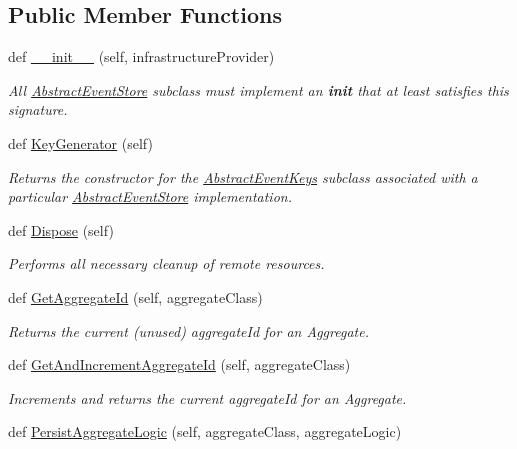 \subsection*{Public Member Functions}
\begin{DoxyCompactItemize}
\item 
def \hyperlink{group__Chronos_ga30a470bc6de0e6aaf468d9ba0abf53be}{\+\_\+\+\_\+init\+\_\+\+\_\+} (self, infrastructure\+Provider)
\begin{DoxyCompactList}\small\item\em All \hyperlink{classChronos_1_1Infrastructure_1_1AbstractEventStore}{Abstract\+Event\+Store} subclass must implement an {\bfseries init} that at least satisfies this signature. \end{DoxyCompactList}\item 
def \hyperlink{group__Chronos_ga865256d9e309eb64c77ba073ca53f6d0}{Key\+Generator} (self)
\begin{DoxyCompactList}\small\item\em Returns the constructor for the \hyperlink{classChronos_1_1Infrastructure_1_1AbstractEventKeys}{Abstract\+Event\+Keys} subclass associated with a particular \hyperlink{classChronos_1_1Infrastructure_1_1AbstractEventStore}{Abstract\+Event\+Store} implementation. \end{DoxyCompactList}\item 
def \hyperlink{group__Chronos_ga17c0011d29ca7707d5b790211327b586}{Dispose} (self)
\begin{DoxyCompactList}\small\item\em Performs all necessary cleanup of remote resources. \end{DoxyCompactList}\item 
def \hyperlink{group__Chronos_ga4a151ebe26b5a8046272920def464107}{Get\+Aggregate\+Id} (self, aggregate\+Class)
\begin{DoxyCompactList}\small\item\em Returns the current (unused) aggregate\+Id for an Aggregate. \end{DoxyCompactList}\item 
def \hyperlink{group__Chronos_ga00579d86cc3a3a7805b76a202046765b}{Get\+And\+Increment\+Aggregate\+Id} (self, aggregate\+Class)
\begin{DoxyCompactList}\small\item\em Increments and returns the current aggregate\+Id for an Aggregate. \end{DoxyCompactList}\item 
def \hyperlink{group__Chronos_gab6a37c0b1d871a0304f4e89fe8e35317}{Persist\+Aggregate\+Logic} (self, aggregate\+Class, aggregate\+Logic)

\end{DoxyCompactItemize}
